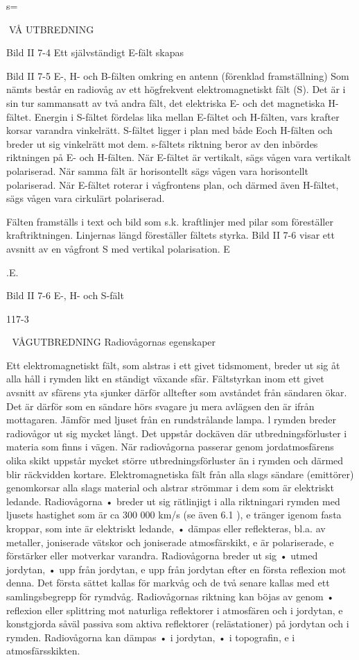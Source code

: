 s=

VÅ UTBREDNING

Bild II 7-4 Ett självständigt E-fält skapas

Bild II 7-5 E-, H- och B-fälten omkring en antenn (förenklad framställning)
Som nämts består en radiovåg av ett högfrekvent elektromagnetiskt fält (S). Det är i
sin tur sammansatt av två andra fält, det
elektriska E- och det magnetiska H-fältet.
Energin i S-fältet fördelas lika mellan E-fältet
och H-fälten, vars krafter korsar varandra
vinkelrätt. S-fältet ligger i plan med både Eoch H-fälten och breder ut sig vinkelrätt mot
dem. s-fältets riktning beror av den inbördes
riktningen på E- och H-fälten.
När E-fältet är vertikalt, sägs vågen vara
vertikalt polariserad. När samma fält är horisontellt sägs vågen vara horisontellt polariserad. När E-fältet roterar i vågfrontens
plan, och därmed även H-fältet, sägs vågen
vara cirkulärt polariserad.

Fälten framställs i text och bild som s.k.
kraftlinjer med pilar som föreställer kraftriktningen. Linjernas längd föreställer fältets
styrka. Bild II 7-6 visar ett avsnitt av en
vågfront S med vertikal polarisation.
E

.E.

Bild II 7-6 E-, H- och S-fält

117-3


VÅGUTBREDNING
Radiovågornas egenskaper

Ett elektromagnetiskt fält, som alstras i ett
givet tidsmoment, breder ut sig åt alla håll i
rymden likt en ständigt växande sfär.
Fältstyrkan inom ett givet avsnitt av sfärens yta sjunker därför alltefter som avståndet från sändaren ökar. Det är därför som en
sändare hörs svagare ju mera avlägsen den
är ifrån mottagaren. Jämför med ljuset från
en rundstrålande lampa.
l rymden breder radiovågor ut sig mycket
långt. Det uppstår dockäven där utbredningsförluster i materia som finns i vägen.
När radiovågorna passerar genom jordatmosfärens olika skikt uppstår mycket större
utbredningsförluster än i rymden och därmed blir räckvidden kortare.
Elektromagnetiska fält från alla slags sändare (emittörer) genomkorsar alla slags material och alstrar strömmar i dem som är
elektriskt ledande.
Radiovågorna
• breder ut sig rätlinjigt i alla riktningari rymden med ljusets hastighet som är ca
300 000 km/s (se även 6.1 ),
e
tränger igenom fasta kroppar, som inte är
elektriskt ledande,
• dämpas eller reflekteras, bl.a. av metaller, joniserade vätskor och joniserade
atmosfärskikt,
e
är polariserade,
e
förstärker eller motverkar varandra.
Radiovågorna breder ut sig
• utmed jordytan,
• upp från jordytan,
e
upp från jordytan efter en första reflexion
mot denna.
Det första sättet kallas för markvåg och
de två senare kallas med ett samlingsbegrepp för rymdvåg.
Radiovågornas riktning kan böjas av genom
• reflexion eller splittring mot naturliga
reflektorer i atmosfären och i jordytan,
e
konstgjorda såväl passiva som aktiva
reflektorer (relästationer) på jordytan och
i rymden.
Radiovågorna kan dämpas
• i jordytan,
• i topografin,
e
i atmosfärsskikten.

